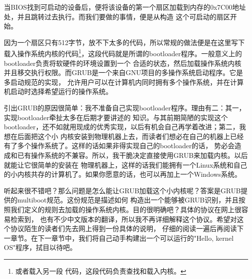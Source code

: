 \par 当BIOS找到可启动的设备后，便将该设备的第一个扇区加载到内存的0x7C00地址处，并且跳转过去执行。而我们要做的事情，便是从构造\allowbreak
这个可启动的扇区开始。

\par 因为一个扇区只有512字节，放不下太多的代码，所以常规的做法便是在这里写下载入操作系统内核的代码\footnote{或者载入另一段\allowbreak
代码，这段代码负责查找和载入内核。}，这段代码就是所谓的bootloader程序。一般意义上的bootloader负责将软硬件的环境设置到一个\allowbreak
合适的状态，然后加载操作系统内核并且移交执行权限。而GRUB是一个来自GNU项目的多操作系统启动程序。它是多启动规范的实现，\allowbreak
允许用户可以在计算机内同时拥有多个操作系统，并在计算机启动时选择希望运行的操作系统。

\par 引出GRUB的原因很简单：我不准备自己实现bootloader程序。理由有二：其一，实现bootloader牵扯太多在后期才要讲述的\allowbreak
知识。与其前期简陋的实现这个bootloader，还不如就用现成的优秀实现，以后有机会自己再学着改进；第二，我想在后面把这个小\allowbreak
内核安装到物理机器上去，而读者们想必在自己的机器上已经有了多个操作系统了。这样的话如果非得实现自己的bootloader的话，\allowbreak
势必会造成和已有操作系统的不兼容。所以，我干脆决定直接使用GRUB来加载内核。以后就能让它很简单的安装在\allowbreak
物理机器上，这样的话我们能拥有一个Linux系统和自己的小内核共存的计算机了。如果你愿意的话，也可以再加上一个Windows系统。

\par 听起来很不错吧？那么问题是怎么能让GRUB加载这个小内核呢？答案是GRUB提供的multiboot规范。这份规范是描述如何\allowbreak
构造出一个能够被GRUB识别，并且按照我们定义的规则去加载的操作系统内核。目的很明确吧？具体的协议在网上很容易检索到，\allowbreak
也有不少中文版本的翻译，所以我不再详细解释这个协议。希望对这个协议陌生的读者们先去网上得到一份具体的说明，\allowbreak
仔细的阅读一遍后再阅读下一章节。在下一章节中，我们将自己动手构建出一个可以运行的"Hello, kernel OS"程序，拭目以待吧。

